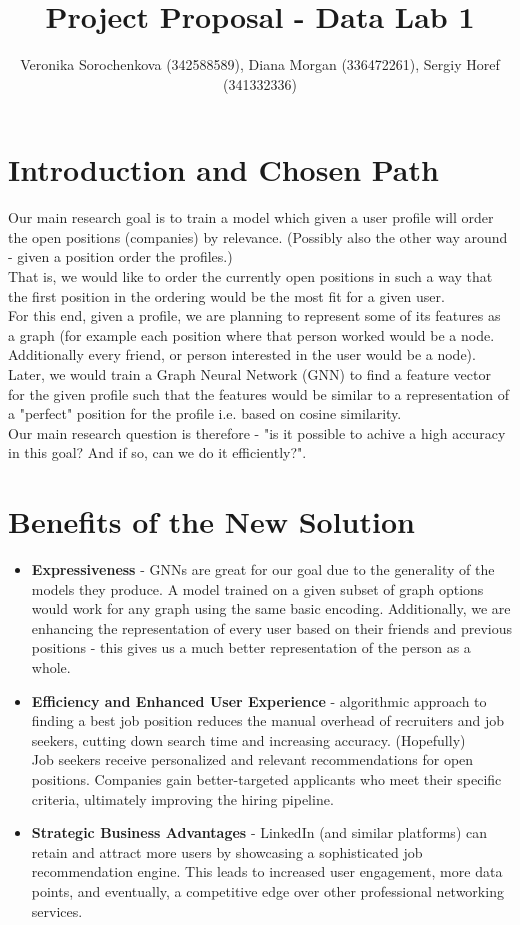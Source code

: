 \documentclass[11pt, oneside]{article}   	%
\title{Project Proposal - Data Lab 1}
\author{Veronika Sorochenkova (342588589), Diana Morgan (336472261), Sergiy Horef (341332336)}
\begin{document}
\maketitle
\section{Introduction and Chosen Path}
Our main research goal is to train a model which given a user profile will order the open positions (companies) by relevance. (Possibly also the other way around - given a position order the profiles.)\\
That is, we would like to order the currently open positions in such a way that the first position in the ordering would be the most fit for a given user.\\

For this end, given a profile, we are planning to represent some of its features as a graph (for example each position where that person worked would be a node. Additionally every friend, or person interested in the user would be a node).\\
Later, we would train a Graph Neural Network (GNN) to find a feature vector for the given profile such that the features would be similar to a representation of a "perfect" position for the profile i.e. based on cosine similarity.\\

Our main research question is therefore - "is it possible to achive a high accuracy in this goal? And if so, can we do it efficiently?".

\section{Benefits of the New Solution}
\begin{itemize}
    \item \textbf{Expressiveness} - GNNs are great for our goal due to the generality of the models they produce. A model trained on a given subset of graph options would work for any graph using the same basic encoding. Additionally, we are enhancing the representation of every user based on their friends and previous positions - this gives us a much better representation of the person as a whole.
    \item \textbf{Efficiency and Enhanced User Experience} - algorithmic approach to finding a best job position reduces the manual overhead of recruiters and job seekers, cutting down search time and increasing accuracy. (Hopefully)\\ Job seekers receive personalized and relevant recommendations for open positions. Companies gain better-targeted applicants who meet their specific criteria, ultimately improving the hiring pipeline.
    \item \textbf{Strategic Business Advantages} - LinkedIn (and similar platforms) can retain and attract more users by showcasing a sophisticated job recommendation engine. This leads to increased user engagement, more data points, and eventually, a competitive edge over other professional networking services.
\end{itemize}
\end{document}
